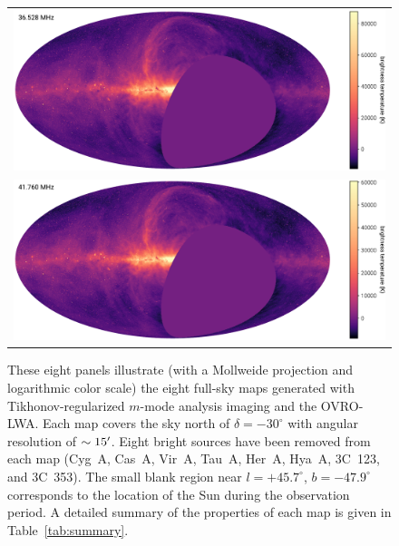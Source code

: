 \begin{bibunit}
\begin{figure}[ht]
    \centering
    \begin{tabular}{c}
        \includegraphics[height=0.32\textheight]{figures/chapter3/spw04} \\
        \includegraphics[height=0.32\textheight]{figures/chapter3/spw06} \\
    \end{tabular}
    \caption{
        These eight panels illustrate (with a Mollweide projection and logarithmic color scale) the
        eight full-sky maps generated with Tikhonov-regularized $m$-mode analysis imaging and the
        OVRO-LWA.  Each map covers the sky north of $\delta=-30^\circ$ with angular resolution of
        $\sim15\mbox{$^\prime$}$. Eight bright sources have been removed from each map (Cyg~A, Cas~A, Vir~A,
        Tau~A, Her~A, Hya~A, 3C~123, and 3C~353). The small blank region near $l=+45.7^\circ$,
        $b=-47.9^\circ$ corresponds to the location of the Sun during the observation period.  A
        detailed summary of the properties of each map is given in Table~\ref{tab:summary}.
    }
    \label{fig:channel-maps}
\end{figure}


\end{bibunit}
